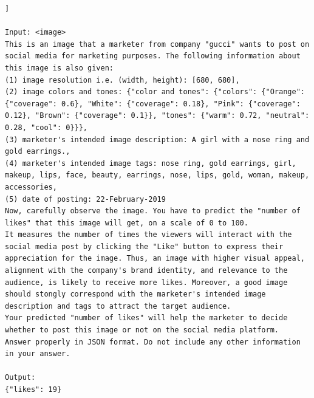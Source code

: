 \begin{lstlisting}[caption={Visual instruction finetuning Pattern: EngageNet predicts user engagement of images given contextual information about the social media post.},frame=single,label={EngageNet:behaviour_simulation-1},basicstyle=\scriptsize]]

Input: <image>
This is an image that a marketer from company "gucci" wants to post on social media for marketing purposes. The following information about this image is also given:
(1) image resolution i.e. (width, height): [680, 680],
(2) image colors and tones: {"color and tones": {"colors": {"Orange": {"coverage": 0.6}, "White": {"coverage": 0.18}, "Pink": {"coverage": 0.12}, "Brown": {"coverage": 0.1}}, "tones": {"warm": 0.72, "neutral": 0.28, "cool": 0}}},
(3) marketer's intended image description: A girl with a nose ring and gold earrings.,
(4) marketer's intended image tags: nose ring, gold earrings, girl, makeup, lips, face, beauty, earrings, nose, lips, gold, woman, makeup, accessories,
(5) date of posting: 22-February-2019
Now, carefully observe the image. You have to predict the "number of likes" that this image will get, on a scale of 0 to 100. 
It measures the number of times the viewers will interact with the social media post by clicking the "Like" button to express their appreciation for the image. Thus, an image with higher visual appeal, alignment with the company's brand identity, and relevance to the audience, is likely to receive more likes. Moreover, a good image should stongly correspond with the marketer's intended image description and tags to attract the target audience. 
Your predicted "number of likes" will help the marketer to decide whether to post this image or not on the social media platform.
Answer properly in JSON format. Do not include any other information in your answer.

Output:
{"likes": 19}
    
\end{lstlisting}

